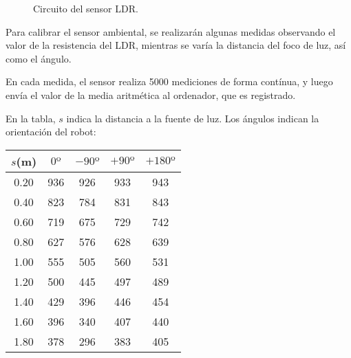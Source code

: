 \documentclass[10pt,a4paper,hidelinks,twocolumn]{article}
\begin{document}
\begin{figure}[h]
\centering
{}
\caption{Circuito del sensor LDR.\label{fig:ldr_circuito}}
\end{figure}

%


Para calibrar el sensor ambiental, se realizarán algunas medidas observando el 
valor de la resistencia del LDR, mientras se varía la distancia del foco de luz, 
así como el ángulo.

En cada medida, el sensor realiza 5000 mediciones de forma contínua, y luego 
envía el valor de la media aritmética al ordenador, que es registrado.

En la tabla, $s$ indica la distancia a la fuente de luz. Los ángulos indican la 
orientación del robot:

\begin{center}
\begin{tabular}{ | c | c | c | c | c | }
\hline
$s$(m) & $0º$ & $-90º$ & $+90º$ & $+180º$ \\ \hline
0.20 & 936 & 926 & 933 & 943 \\ \hline
0.40 & 823 & 784 & 831 & 843 \\ \hline
0.60 & 719 & 675 & 729 & 742 \\ \hline
0.80 & 627 & 576 & 628 & 639 \\ \hline
1.00 & 555 & 505 & 560 & 531 \\ \hline
1.20 & 500 & 445 & 497 & 489 \\ \hline
1.40 & 429 & 396 & 446 & 454 \\ \hline
1.60 & 396 & 340 & 407 & 440 \\ \hline
1.80 & 378 & 296 & 383 & 405 \\ \hline
\end{tabular}
\end{center}
\end{document}
